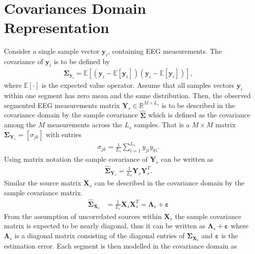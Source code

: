 \section{Covariances Domain Representation}\label{sec:cov}
Consider a single sample vector $\textbf{y}_i$, containing EEG measurements. 
The covariance of $\textbf{y}_i$ is to be defined by
\begin{align*}
\boldsymbol{\Sigma}_{\textbf{y}_i}=\mathbb{E}[(\textbf{y}_i-\mathbb{E}[\textbf{y}_i])(\textbf{y}_i-\mathbb{E}[\textbf{y}_i])],
\end{align*}
where $\mathbb{E}[\cdot]$ is the expected value operator. 
Assume that all samples vectors $\textbf{y}_i$ within one segment has zero mean and the same distribution. 
Then, the observed segmented EEG measurements matrix $\mathbf{Y}_s \in \mathbb{R}^{M \times L_s}$ is to be described in the covariance domain by the sample covariance $\widehat{\boldsymbol{\Sigma}}$ which is defined as the covariance among the $M$ measurements across the $L_s$ samples. That is a $M \times M$ matrix $\boldsymbol{\Sigma}_{\mathbf{Y}_s}=[\sigma_{jk}]$ with entries 
\begin{align*}
\sigma_{jk}= \frac{1}{L_s}\sum_{i=1}^{L_s} y_{ji} y_{ki}.
\end{align*}
Using matrix notation the sample covariance of $\mathbf{Y}_s$ can be written as
\begin{align*}
\widehat{\boldsymbol{\Sigma}}_{\mathbf{Y}_s} = \frac{1}{L_s} \mathbf{Y}_s \mathbf{Y}_s^T.
\end{align*}  
Similar the source matrix $\mathbf{X}_s$ can be described in the covariance domain by the sample covariance matrix.
\begin{align*}
\widehat{\boldsymbol{\Sigma}}_{\mathbf{X}_s} &= \frac{1}{L_s} \mathbf{X}_s \mathbf{X}_s^T = \boldsymbol{\Lambda}_s + \boldsymbol{\varepsilon} 
\end{align*}
From the assumption of uncorrelated sources within $\mathbf{X}_s$ the sample covariance matrix is expected to be nearly diagonal, thus it can be written as $\boldsymbol{\Lambda}_s + \boldsymbol{\varepsilon}$ where $\boldsymbol{\Lambda}_s$ is a diagonal matrix consisting of the diagonal entries of $\widehat{\boldsymbol{\Sigma}}_{\mathbf{X}_s}$ and $ \boldsymbol{\varepsilon}$ is the estimation error\cite{Balkan2015}.
Each segment is then modelled in the covariance domain as
